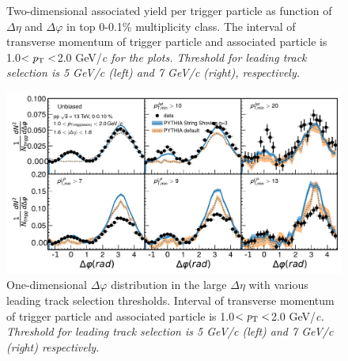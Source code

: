 \begin{figure}
	\centering
	\caption{ Two-dimensional associated yield per trigger particle as function of $\Delta\eta$ and $\Delta\varphi$ in top 0-0.1\% multiplicity class. The interval of transverse momentum of trigger particle and associated particle is 1.0$<\it{p}_{\rm{T}}<$2.0 GeV/\it{c}\rm{} for the plots. Threshold for leading track selection is 5 GeV/\it{c}\rm{} (left) and 7 GeV/\it{c}\rm{} (right), respectively. }
\end{figure}

\begin{figure}[h!]
	\centering
	\includegraphics[width=0.99\linewidth]{./figures/Fig5_PlotDeltaPhiESE.pdf}
	\caption{One-dimensional $\Delta\varphi$ distribution in the large $\Delta\eta$ with various leading track selection thresholds. Interval of transverse momentum of trigger particle and associated particle is 1.0$<\it{p}_{\rm{T}}<$2.0 GeV/\it{c}\rm{}. Threshold for leading track selection is 5 GeV/\it{c}\rm{} (left) and 7 GeV/\it{c}\rm{} (right) respectively.}
	\label{fig:PlotDeltaPhiESE}
\end{figure}



